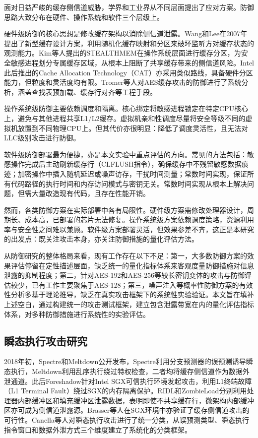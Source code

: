 面对日益严峻的缓存侧信道威胁，学界和工业界从不同层面提出了应对方案。防御思路大致分布在硬件、操作系统和软件三个层级上。

硬件级防御的核心思想是修改缓存架构以消除侧信道泄露。Wang和Lee在2007年提出了新型缓存设计方案\cite{WangLee2007}，利用随机化缓存映射和分区来破坏监听方对缓存状态的观测能力。Kim等人提出的STEALTHMEM\cite{Kim2012}在操作系统层面进行缓存分区，为安全敏感进程划分专属缓存区域，从根本上阻断了共享缓存带来的侧信道风险。Intel此后推出的Cache Allocation Technology（CAT）亦采用类似路线，具备硬件分区能力，但粒度和灵活度均有限。Tromer等人对AES缓存攻击的防御进行了系统分析，涵盖查找表预加载、缓存行对齐等工程手段。

操作系统级防御主要依赖调度和隔离。核心绑定将敏感进程锁定在特定CPU核心上，避免与其他进程共享L1/L2缓存。虚拟机亲和性调度尽量将安全等级不同的虚拟机放置到不同物理CPU上。但其代价亦很明显：降低了调度灵活性，且无法对LLC级别攻击进行防御。

软件级防御部署最为便捷，亦是本文实验中重点评估的方向。常见的方法包括：敏感操作完成后主动刷新缓存行（CLFLUSH指令），确保缓存中不残留敏感数据痕迹；加密操作中插入随机延迟或噪声访存，干扰时间测量；常数时间实现，保证所有代码路径的执行时间和内存访问模式与密钥无关。常数时间实现从根本上解决问题，但需大量改造现有代码，且存在性能开销。

然而，各类防御方案在实际部署中各有局限性。硬件级方案需修改处理器设计，周期长、成本高，已部署的芯片无法修复。操作系统级方案依赖调度策略，资源利用率与安全性之间难以兼顾。软件级方案部署灵活，但效果参差不齐，这正是本研究的出发点：既关注攻击本身，亦关注防御措施的量化评估方法。

从防御研究的整体格局来看，现有工作存在以下不足：第一，大多数防御方案的效果评估停留在定性描述层面，缺乏统一的量化指标体系来客观度量防御措施对信息泄露的抑制程度；第二，针对AES-192和AES-256等较长密钥变体的攻击与防御评估较少，已有工作主要聚焦于AES-128；第三，噪声注入等概率性防御方案的有效性分析多基于理论推导，缺乏在真实攻击框架下的系统性实验验证。本文旨在填补上述空白，通过构建统一的攻击测试框架，建立包含泄露带宽在内的量化评估指标体系，对多种防御措施进行系统性的实验评估。

\subsection{瞬态执行攻击研究}

2018年初，Spectre和Meltdown公开发布，Spectre利用分支预测器的误预测诱导瞬态执行，Meltdown利用乱序执行绕过特权检查，二者均将缓存侧信道作为数据外泄通道。此后Foreshadow针对Intel SGX可信执行环境发起攻击，利用L1终端故障（L1 Terminal Fault）绕过SGX的内存隔离保护。RIDL和ZombieLoad分别利用处理器内部缓冲区和填充缓冲区泄露数据，表明即使不共享缓存行，微架构内部缓冲区亦可成为侧信道泄露源。Brasser等人\cite{Brasser2017}在SGX环境中亦验证了缓存侧信道攻击的可行性。Canella等人对瞬态执行攻击进行了统一分类，从误预测类型、瞬态执行指令窗口和数据外泄方式三个维度建立了系统化的分类框架。

